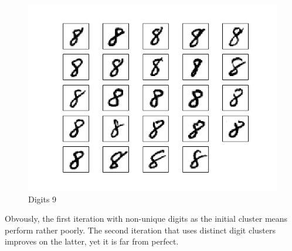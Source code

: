 \documentclass[10pt]{article}
\begin{document}
\begin{figure}
\begin{center}
\includegraphics[scale=0.5]{meansB9}
\caption{Digits 9}
\end{center}
\end{figure}
Obvously, the first iteration with non-unique digits as the initial cluster means perform rather poorly. The second iteration that uses distinct digit clusters improves on the latter, yet it is far from perfect.
\end{document}
